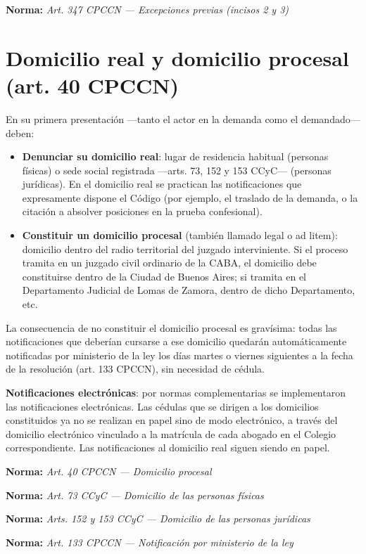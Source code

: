 \documentclass[12pt,oneside]{book}
\newcommand{\norma}[1]{%
\par\noindent\textbf{Norma:} \textit{#1}\par\smallskip
}
\begin{document}
\norma{Art. 347 CPCCN --- Excepciones previas (incisos 2 y 3)}

\section{Domicilio real y domicilio procesal (art. 40 CPCCN)}

En su primera presentación —tanto el actor en la demanda como el demandado— deben:

\begin{itemize}
    \item \textbf{Denunciar su domicilio real}: lugar de residencia habitual (personas físicas) o sede social registrada —arts. 73, 152 y 153 CCyC— (personas jurídicas). En el domicilio real se practican las notificaciones que expresamente dispone el Código (por ejemplo, el traslado de la demanda, o la citación a absolver posiciones en la prueba confesional).
    \item \textbf{Constituir un domicilio procesal} (también llamado legal o ad litem): domicilio dentro del radio territorial del juzgado interviniente. Si el proceso tramita en un juzgado civil ordinario de la CABA, el domicilio debe constituirse dentro de la Ciudad de Buenos Aires; si tramita en el Departamento Judicial de Lomas de Zamora, dentro de dicho Departamento, etc.
\end{itemize}

\begin{important}
La consecuencia de no constituir el domicilio procesal es gravísima: todas las notificaciones que deberían cursarse a ese domicilio quedarán automáticamente notificadas por ministerio de la ley los días martes o viernes siguientes a la fecha de la resolución (art. 133 CPCCN), sin necesidad de cédula.
\end{important}

\textbf{Notificaciones electrónicas}: por normas complementarias se implementaron las notificaciones electrónicas. Las cédulas que se dirigen a los domicilios constituidos ya no se realizan en papel sino de modo electrónico, a través del domicilio electrónico vinculado a la matrícula de cada abogado en el Colegio correspondiente. Las notificaciones al domicilio real siguen siendo en papel.

\norma{Art. 40 CPCCN --- Domicilio procesal}
\norma{Art. 73 CCyC --- Domicilio de las personas físicas}
\norma{Arts. 152 y 153 CCyC --- Domicilio de las personas jurídicas}
\norma{Art. 133 CPCCN --- Notificación por ministerio de la ley}
\end{document}
